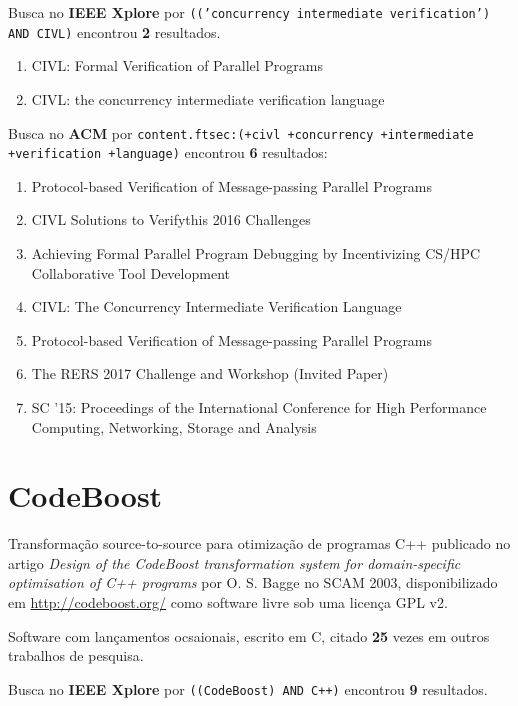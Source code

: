 Busca no {\bf IEEE Xplore} por
\texttt{(('concurrency intermediate verification') AND CIVL)}
encontrou {\bf 2}
resultados.

\begin{enumerate}
\item CIVL: Formal Verification of Parallel Programs
\item CIVL: the concurrency intermediate verification language
\end{enumerate}

Busca no {\bf ACM} por
\texttt{content.ftsec:(+civl +concurrency +intermediate +verification +language)}
encontrou {\bf 6}
resultados:

\begin{enumerate}
\item Protocol-based Verification of Message-passing Parallel Programs
\item CIVL Solutions to Verifythis 2016 Challenges
\item Achieving Formal Parallel Program Debugging by Incentivizing CS/HPC Collaborative Tool Development
\item CIVL: The Concurrency Intermediate Verification Language
\item Protocol-based Verification of Message-passing Parallel Programs
\item The RERS 2017 Challenge and Workshop (Invited Paper)
\item SC '15: Proceedings of the International Conference for High Performance Computing, Networking, Storage and Analysis
\end{enumerate}

\section{CodeBoost}

Transformação source-to-source para otimização de programas C++
publicado no artigo {\it Design of the CodeBoost transformation system for domain-specific optimisation of C++ programs}
por O. S. Bagge
no SCAM 2003,
disponibilizado em \url{http://codeboost.org/}
como software livre
sob uma licença GPL v2.

Software com lançamentos ocsaionais,
escrito em C,
citado {\bf 25} vezes em outros trabalhos de pesquisa.

Busca no {\bf IEEE Xplore} por
\texttt{((CodeBoost) AND C++)}
encontrou {\bf 9}
resultados.

